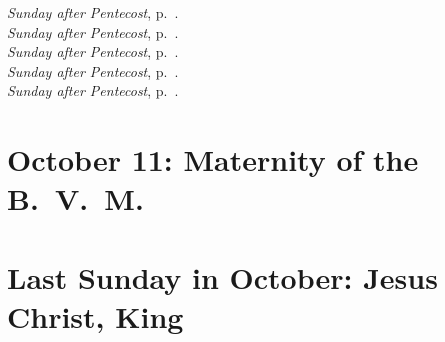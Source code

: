 {{{\begin{multicols}{2}
\noindent\emph{ Sunday after Pentecost}, p.~\pageref{pentecost16}.\\
\emph{ Sunday after Pentecost}, p.~\pageref{pentecost17}.\\
\emph{ Sunday after Pentecost}, p.~\pageref{pentecost18}.\\
\emph{ Sunday after Pentecost}, p.~\pageref{pentecost19}.\\
\emph{ Sunday after Pentecost}, p.~\pageref{pentecost20}.
\end{multicols}
}
\medskip
\benedicamusdomino{}
}

{
\section{October 11: Maternity of the B.~V.~M.}
\subtitle{ Class, White}
\vspace{-1.5\baselineskip}
\subtitle{I \& II Vespers}

\def\definevesperspropers{
}
\def\definevesperspropersalt{}
\def\vesperspropersnote{At II Vespers:}
\def\vesperspropersaltnote{At I Vespers:}
\def\printhymnnote{
  {
    \oldneedspace{3\baselineskip}
    \printnote{Hymn.~\emph{Ave Maris Stella}, p.~\pageref{hymn-avemarisstella}.\\}
  }
}
\def\prepsalmtitleone{\vspace{-0.4\baselineskip}}
\def\prepsalmtitletwo{\vspace{-0.6\baselineskip}}


\medskip
\benedicamusdomino[mary]{}
}

{
\section{Last Sunday in October: Jesus Christ, King}
\subtitle{ Class, White or Gold}
\subtitle{II Vespers}

\def\postpsalmtitletwo{\pagebreak}
\def\prerepeatantiphontwo{}
\def\definevesperspropers{}
\def\beginchaptercols{\begin{parcolumns}[rulebetween,colwidths={1=0.46\linewidth}]{2}}

}}
